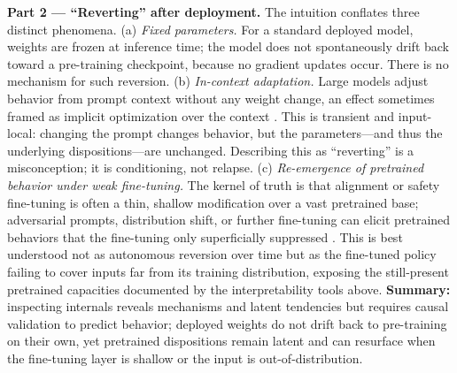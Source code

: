 \documentclass[11pt]{article}
\begin{document}
\textbf{Part 2 --- ``Reverting'' after deployment.} The intuition conflates three distinct phenomena. (a) \emph{Fixed parameters.} For a standard deployed model, weights are frozen at inference time; the model does not spontaneously drift back toward a pre-training checkpoint, because no gradient updates occur. There is no mechanism for such reversion. (b) \emph{In-context adaptation.} Large models adjust behavior from prompt context without any weight change, an effect sometimes framed as implicit optimization over the context \citep{garg2022incontext}. This is transient and input-local: changing the prompt changes behavior, but the parameters---and thus the underlying dispositions---are unchanged. Describing this as ``reverting'' is a misconception; it is conditioning, not relapse. (c) \emph{Re-emergence of pretrained behavior under weak fine-tuning.} The kernel of truth is that alignment or safety fine-tuning is often a thin, shallow modification over a vast pretrained base; adversarial prompts, distribution shift, or further fine-tuning can elicit pretrained behaviors that the fine-tuning only superficially suppressed \citep{wei2023jailbroken}. This is best understood not as autonomous reversion over time but as the fine-tuned policy failing to cover inputs far from its training distribution, exposing the still-present pretrained capacities documented by the interpretability tools above. \textbf{Summary:} inspecting internals reveals mechanisms and latent tendencies but requires causal validation to predict behavior; deployed weights do not drift back to pre-training on their own, yet pretrained dispositions remain latent and can resurface when the fine-tuning layer is shallow or the input is out-of-distribution.
\end{document}
